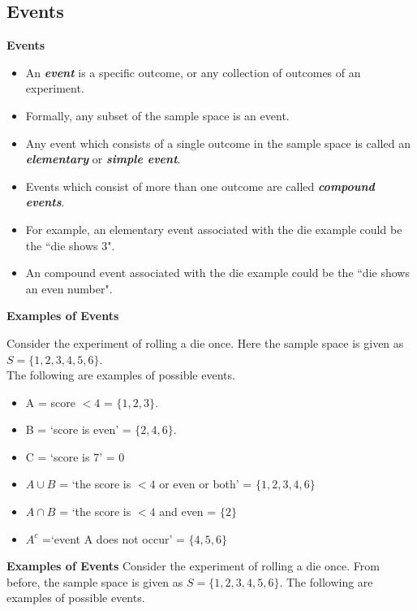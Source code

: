 \documentclass[]{report}
\begin{document}
{%
{
\subsection{Events}

\textbf{Events}
\begin{itemize}
\item 
An \textbf{\emph{event}} is a specific outcome, or any collection of outcomes of an experiment.
\item  Formally, any subset of the sample space is an event.
\item  Any event which consists of a single outcome in the sample space is called an \textbf{\emph{elementary}}  or \textbf{\emph{simple event}}.
\item  Events which consist of more than one outcome are called \textbf{\emph{compound events}}.
\item  For example, an elementary event associated with the die example could be the ``die shows $3$".
\item  An compound event associated with the die example could be the ``die shows an even number".
\end{itemize}






\begin{framed}
\noindent \textbf{Examples of Events}

\noindent Consider the experiment of rolling a die once. Here the sample space
is given as $S = \{ 1,2,3,4,5,6\}$. \\ The following are examples of possible events.


\begin{multicols}{2}
\begin{itemize} 
\item A = score $< 4$ = $\{ 1,2,3\}$.
\item B = `score is even' = $\{ 2,4,6\}$.
\item C = `score is 7' = 0
\item $A\cup B$ = `the score is $< 4$  or even or both' = $\{ 1,2,3,4,6\}$
\item $A\cap B$ = `the score is $< 4$  and even = $ \{ 2 \}$
\item $A^c$ =`event A does not occur' = $ \{ 4,5,6\}$
\end{itemize}
\end{multicols}
\end{framed}
{
\textbf{Examples of Events}
Consider the experiment of rolling a die once. From before, the sample space is given as $S = \{1,2,3,4,5,6\}$. The following are examples of possible events.

}}}
\end{document}
